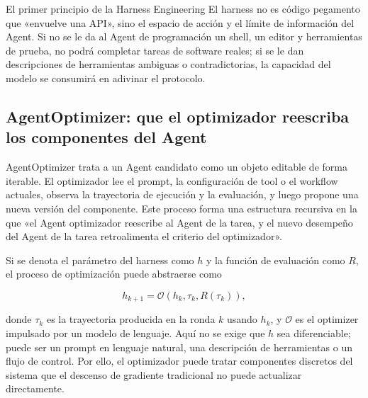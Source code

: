 \begin{knowledgebox}{El primer principio de la Harness Engineering}
El harness no es código pegamento que «envuelve una API», sino el espacio de acción y el límite de información del Agent. Si no se le da al Agent de programación un shell, un editor y herramientas de prueba, no podrá completar tareas de software reales; si se le dan descripciones de herramientas ambiguas o contradictorias, la capacidad del modelo se consumirá en adivinar el protocolo.
\end{knowledgebox}

\subsection{AgentOptimizer: que el optimizador reescriba los componentes del Agent}

AgentOptimizer trata a un Agent candidato como un objeto editable de forma iterable. El optimizador lee el prompt, la configuración de tool o el workflow actuales, observa la trayectoria de ejecución y la evaluación, y luego propone una nueva versión del componente. Este proceso forma una estructura recursiva en la que «el Agent optimizador reescribe al Agent de la tarea, y el nuevo desempeño del Agent de la tarea retroalimenta el criterio del optimizador».



Si se denota el parámetro del harness como $h$ y la función de evaluación como $R$, el proceso de optimización puede abstraerse como

$$
h_{k+1}=\mathcal{O}\!\left(h_k,\tau_k,R(\tau_k)\right),
$$

donde $\tau_k$ es la trayectoria producida en la ronda $k$ usando $h_k$, y $\mathcal{O}$ es el optimizer impulsado por un modelo de lenguaje. Aquí no se exige que $h$ sea diferenciable; puede ser un prompt en lenguaje natural, una descripción de herramientas o un flujo de control. Por ello, el optimizador puede tratar componentes discretos del sistema que el descenso de gradiente tradicional no puede actualizar directamente.


